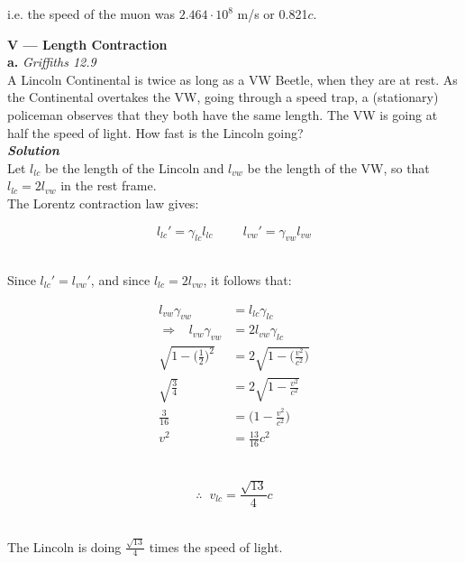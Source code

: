 \documentclass[9pt]{extarticle}
\newcommand{\bfit}[1]{\textbf{\textit{#1}}}
\begin{document}
\begin{multicols*}{2}
i.e. the speed of the muon was $2.464 \cdot 10^8$ m/s or 0.821$c$. \\ 



 





\hrulefill 

\hfill 

{\LARGE \bf V --- Length Contraction} \\ 

{\Large \bf a.} {\it Griffiths 12.9} \\ 

A Lincoln Continental is twice as long as a VW Beetle, when they are at rest. As the Continental overtakes the VW, going through a speed trap, a (stationary) policeman observes that they both have the same length. The VW is going at half the speed of light. How fast is the Lincoln going? \\ 

{\bfit{Solution}} \\ 

Let $l_{lc}$ be the length of the Lincoln and $l_{vw}$ be the length of the VW, so that $l_{lc} = 2l_{vw}$ in the rest frame. \\ 

The Lorentz contraction law gives:

$$l_{lc}' = \gamma_{lc} l_{lc} \hspace{1cm} l_{vw}' = \gamma_{vw} l_{vw}$$ \ 

Since $l_{lc}' = l_{vw}'$, and since $l_{lc} = 2l_{vw}$, it follows that:

$$
\begin{aligned}
	l_{vw} \gamma_{vw} &= l_{lc} \gamma_{lc} \\ 
	\Longrightarrow \;\;\; l_{vw} \gamma_{vw} &= 2l_{vw} \gamma_{lc} \\ 
	\sqrt{1-\big(\tfrac 12 \big)^2} &= 2\sqrt{1-\big( \tfrac{v^2}{c^2}\big)} \\ 
	\sqrt{\frac 34} &= 2\sqrt{ 1-\frac{v^2}{c^2}} \\
	\frac{3}{16} &=  \bigg( 1-\frac{v^2}{c^2} \bigg) \\ 
	v^2 &= \frac{13}{16}c^2 
\end{aligned}
$$ \ 

$$\therefore \;\; v_{lc} = \frac{\sqrt{13}}{4} c$$ \ 

The Lincoln is doing $\frac{\sqrt{13}}{4}$ times the speed of light. \\ 


\end{multicols*}
\end{document}
